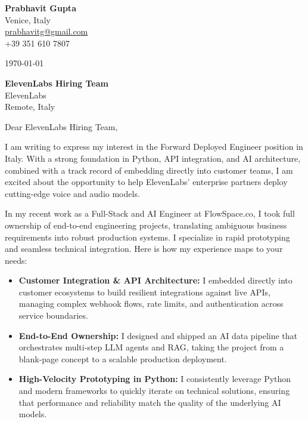 \documentclass[11pt,a4paper]{article}
\begin{document}
\begin{flushleft}
    \textbf{Prabhavit Gupta} \\
    Venice, Italy \\
    \href{mailto:prabhavitg@gmail.com}{prabhavitg@gmail.com} \\
    +39 351 610 7807
\end{flushleft}

\vspace{20pt}

\noindent \today

\vspace{20pt}

\noindent \textbf{ElevenLabs Hiring Team} \\
ElevenLabs \\
Remote, Italy

\vspace{20pt}

\noindent Dear ElevenLabs Hiring Team,

\vspace{10pt}

\noindent I am writing to express my interest in the Forward Deployed Engineer position in Italy. With a strong foundation in Python, API integration, and AI architecture, combined with a track record of embedding directly into customer teams, I am excited about the opportunity to help ElevenLabs' enterprise partners deploy cutting-edge voice and audio models.

\vspace{10pt}

\noindent In my recent work as a Full-Stack and AI Engineer at FlowSpace.co, I took full ownership of end-to-end engineering projects, translating ambiguous business requirements into robust production systems. I specialize in rapid prototyping and seamless technical integration. Here is how my experience maps to your needs:

\begin{itemize}[leftmargin=*]
    \item \textbf{Customer Integration \& API Architecture:} I embedded directly into customer ecosystems to build resilient integrations against live APIs, managing complex webhook flows, rate limits, and authentication across service boundaries.
    \item \textbf{End-to-End Ownership:} I designed and shipped an AI data pipeline that orchestrates multi-step LLM agents and RAG, taking the project from a blank-page concept to a scalable production deployment.
    \item \textbf{High-Velocity Prototyping in Python:} I consistently leverage Python and modern frameworks to quickly iterate on technical solutions, ensuring that performance and reliability match the quality of the underlying AI models.
\end{itemize}
\end{document}
